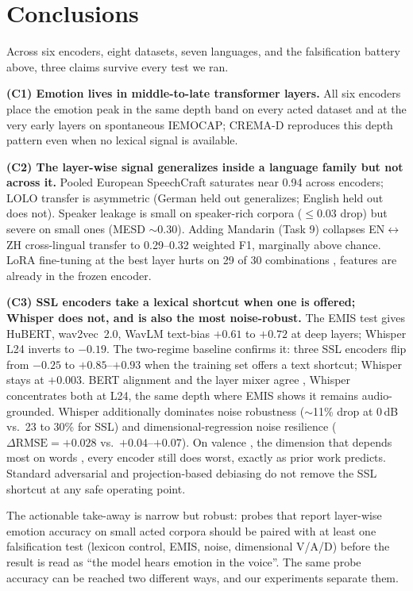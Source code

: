 \documentclass[sigconf,screen]{acmart}
\begin{document}
\section{Conclusions}
Across six encoders, eight datasets, seven languages, and the falsification battery above, three claims survive every test we ran.

\textbf{(C1) Emotion lives in middle-to-late transformer layers.} All six encoders place the emotion peak in the same depth band on every acted dataset and at the very early layers on spontaneous IEMOCAP; CREMA-D reproduces this depth pattern even when no lexical signal is available.

\textbf{(C2) The layer-wise signal generalizes inside a language family but not across it.} Pooled European SpeechCraft saturates near 0.94 across encoders; LOLO transfer is asymmetric (German held out generalizes; English held out does not). Speaker leakage is small on speaker-rich corpora ($\le 0.03$ drop) but severe on small ones (MESD $\sim 0.30$). Adding Mandarin (Task 9) collapses EN$\leftrightarrow$ZH cross-lingual transfer to 0.29--0.32 weighted F1, marginally above chance. LoRA fine-tuning at the best layer hurts on 29 of 30 combinations , features are already in the frozen encoder.

\textbf{(C3) SSL encoders take a lexical shortcut when one is offered; Whisper does not, and is also the most noise-robust.} The EMIS test gives HuBERT, wav2vec~2.0, WavLM text-bias $+0.61$ to $+0.72$ at deep layers; Whisper L24 inverts to $-0.19$. The two-regime baseline confirms it: three SSL encoders flip from $-0.25$ to $+0.85$--$+0.93$ when the training set offers a text shortcut; Whisper stays at $+0.003$. BERT alignment and the layer mixer agree , Whisper concentrates both at L24, the same depth where EMIS shows it remains audio-grounded. Whisper additionally dominates noise robustness ($\sim$11\% drop at 0\,dB vs.\ 23 to 30\% for SSL) and dimensional-regression noise resilience ($\Delta\text{RMSE}=+0.028$ vs.\ $+0.04$--$+0.07$). On valence , the dimension that depends most on words , every encoder still does worst, exactly as prior work predicts. Standard adversarial and projection-based debiasing do not remove the SSL shortcut at any safe operating point.

\noindent The actionable take-away is narrow but robust: probes that report layer-wise emotion accuracy on small acted corpora should be paired with at least one falsification test (lexicon control, EMIS, noise, dimensional V/A/D) before the result is read as ``the model hears emotion in the voice''. The same probe accuracy can be reached two different ways, and our experiments separate them.
\end{document}
